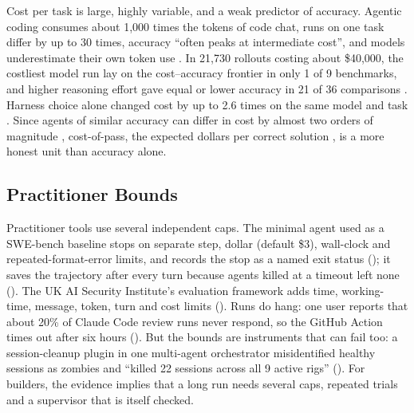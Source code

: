 Cost per task is large, highly variable, and a weak predictor of accuracy. Agentic coding consumes about 1,000 times the tokens of code chat, runs on one task differ by up to 30 times, accuracy ``often peaks at intermediate cost'', and models underestimate their own token use \citep{F6}. In 21,730 rollouts costing about \$40,000, the costliest model run lay on the cost--accuracy frontier in only 1 of 9 benchmarks, and higher reasoning effort gave equal or lower accuracy in 21 of 36 comparisons \citep{F7}. Harness choice alone changed cost by up to 2.6 times on the same model and task \citep{F23}. Since agents of similar accuracy can differ in cost by almost two orders of magnitude \citep{A10}, cost-of-pass, the expected dollars per correct solution \citep{F8}, is a more honest unit than accuracy alone.

\subsection{Practitioner Bounds}

Practitioner tools use several independent caps. The minimal agent used as a SWE-bench baseline stops on separate step, dollar (default \$3), wall-clock and repeated-format-error limits, and records the stop as a named exit status (); it saves the trajectory after every turn because agents killed at a timeout left none (). The UK AI Security Institute's evaluation framework adds time, working-time, message, token, turn and cost limits (). Runs do hang: one user reports that about 20\% of Claude Code review runs never respond, so the GitHub Action times out after six hours (). But the bounds are instruments that can fail too: a session-cleanup plugin in one multi-agent orchestrator misidentified healthy sessions as zombies and ``killed 22 sessions across all 9 active rigs'' (). For builders, the evidence implies that a long run needs several caps, repeated trials and a supervisor that is itself checked.
